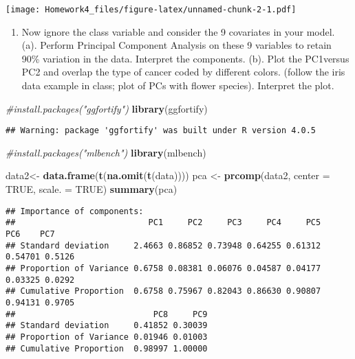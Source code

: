 \documentclass[
]{article}
\newenvironment{Shaded}{\begin{snugshade}}{\end{snugshade}}
\newcommand{\CommentTok}[1]{\textcolor[rgb]{0.56,0.35,0.01}{\textit{#1}}}
\newcommand{\DataTypeTok}[1]{\textcolor[rgb]{0.13,0.29,0.53}{#1}}
\newcommand{\KeywordTok}[1]{\textcolor[rgb]{0.13,0.29,0.53}{\textbf{#1}}}
\newcommand{\NormalTok}[1]{#1}
\newcommand{\OtherTok}[1]{\textcolor[rgb]{0.56,0.35,0.01}{#1}}
\newcommand{\StringTok}[1]{\textcolor[rgb]{0.31,0.60,0.02}{#1}}
\providecommand{\tightlist}{%
  \setlength{\itemsep}{0pt}\setlength{\parskip}{0pt}}
\begin{document}
\texttt{[image: Homework4\_files/figure-latex/unnamed-chunk-2-1.pdf]}

\begin{enumerate}
\def\labelenumi{\arabic{enumi}.}
\setcounter{enumi}{2}
\tightlist
\item
  Now ignore the class variable and consider the 9 covariates in your
  model. (a). Perform Principal Component Analysis on these 9 variables
  to retain 90\% variation in the data. Interpret the components. (b).
  Plot the PC1versus PC2 and overlap the type of cancer coded by
  different colors. (follow the iris data example in class; plot of PCs
  with flower species). Interpret the plot.
\end{enumerate}

\begin{Shaded}
\begin{Highlighting}[]
\CommentTok{#install.packages("ggfortify")}
\KeywordTok{library}\NormalTok{(ggfortify)}
\end{Highlighting}
\end{Shaded}

\begin{verbatim}
## Warning: package 'ggfortify' was built under R version 4.0.5
\end{verbatim}

\begin{Shaded}
\begin{Highlighting}[]
\CommentTok{#install.packages("mlbench")}
\KeywordTok{library}\NormalTok{(mlbench)}

\NormalTok{data2<-}\StringTok{ }\KeywordTok{data.frame}\NormalTok{(}\KeywordTok{t}\NormalTok{(}\KeywordTok{na.omit}\NormalTok{(}\KeywordTok{t}\NormalTok{(data))))}
\NormalTok{pca <-}\StringTok{ }\KeywordTok{prcomp}\NormalTok{(data2, }\DataTypeTok{center =} \OtherTok{TRUE}\NormalTok{, }\DataTypeTok{scale. =} \OtherTok{TRUE}\NormalTok{)}
\KeywordTok{summary}\NormalTok{(pca)}
\end{Highlighting}
\end{Shaded}

\begin{verbatim}
## Importance of components:
##                           PC1     PC2     PC3     PC4     PC5     PC6    PC7
## Standard deviation     2.4663 0.86852 0.73948 0.64255 0.61312 0.54701 0.5126
## Proportion of Variance 0.6758 0.08381 0.06076 0.04587 0.04177 0.03325 0.0292
## Cumulative Proportion  0.6758 0.75967 0.82043 0.86630 0.90807 0.94131 0.9705
##                            PC8     PC9
## Standard deviation     0.41852 0.30039
## Proportion of Variance 0.01946 0.01003
## Cumulative Proportion  0.98997 1.00000
\end{verbatim}
\end{document}
